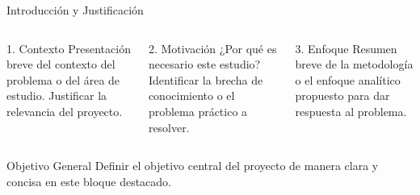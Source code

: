 \documentclass[aspectratio=169, xcolor={dvipsnames}, 8pt, spanish]{beamer}
\title[[Título Corto]]{[Título Completo de la Presentación]}
\subtitle{[Subtítulo de la Presentación / Proyecto]}
\author[[Autor Corto]]{[Nombre Completo del Expositor]}
\institute[[Siglas Institución]]{[Nombre de la Institución / Universidad]}
\date{\today}
\begin{document}
\begin{frame}
    \titlepage
\end{frame}

\begin{frame}{Introducción y Justificación}

\begin{columns}[T,onlytextwidth]
\begin{column}{0.32\textwidth}
\begin{block}{1. Contexto}
    Presentación breve del contexto del problema o del área de estudio. Justificar la relevancia del proyecto.
\end{block}
\end{column}
\begin{column}{0.32\textwidth}
\begin{block}{2. Motivación}
    ¿Por qué es necesario este estudio? Identificar la brecha de conocimiento o el problema práctico a resolver.
\end{block}
\end{column}
\begin{column}{0.32\textwidth}
\begin{block}{3. Enfoque}
    Resumen breve de la metodología o el enfoque analítico propuesto para dar respuesta al problema.
\end{block}
\end{column}
\end{columns}

\begin{block}{Objetivo General}
    Definir el objetivo central del proyecto de manera clara y concisa en este bloque destacado.
\end{block}

\end{frame}
\end{document}
